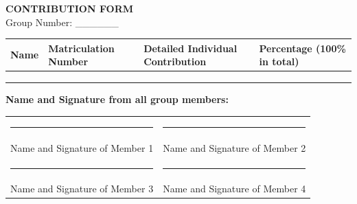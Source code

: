 \documentclass[11pt,a4paper]{article}
\begin{document}
\newpage
\begin{center}
    {\LARGE \textbf{CONTRIBUTION FORM}} \\[0.5cm]
    Group Number: \_\_\_\_\_\_
\end{center}

\vspace{0.5cm}

\begin{table}[H]
\centering
\renewcommand{\arraystretch}{1.8}
\begin{tabular}{|p{3cm}|p{2.5cm}|p{5.5cm}|p{2cm}|}
\hline
\textbf{Name} & \textbf{Matriculation Number} & \textbf{Detailed Individual Contribution} & \textbf{Percentage (100\% in total)} \\
\hline
 &  &  &  \\
\hline
 &  &  &  \\
\hline
 &  &  &  \\
\hline
\end{tabular}
\end{table}

\vspace{1.5cm}
\textbf{Name and Signature from all group members:}

\vspace{1.5cm}

\begin{tabular}{p{7cm}p{7cm}}
\rule{6cm}{0.4pt} & \rule{6cm}{0.4pt} \\
Name and Signature of Member 1 & Name and Signature of Member 2 \\[2cm]
\rule{6cm}{0.4pt} & \rule{6cm}{0.4pt} \\
Name and Signature of Member 3 & Name and Signature of Member 4 \\
\end{tabular}
\end{document}
